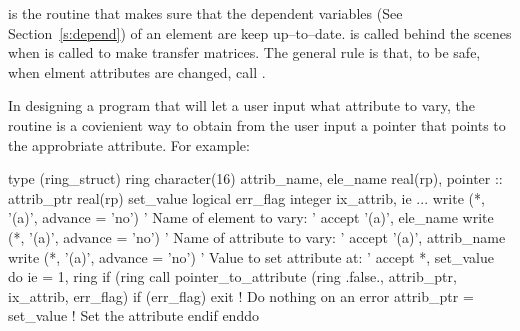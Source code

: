 {{{{{{{{{{{{ is the routine that makes sure that the
dependent variables (See Section~\ref{s:depend}) of an element are
keep up--to--date.  is called behind the
scenes when  is called to make transfer matrices. The
general rule is that, to be safe, when elment attributes are changed,
call .

In designing a program that will let a user input what
attribute to vary, the routine  
is a covienient way to obtain from the user input a pointer
that points to the approbriate attribute.
For example:
\begin{example}
  type (ring_struct) ring
  character(16) attrib_name, ele_name
  real(rp), pointer :: attrib_ptr
  real(rp) set_value
  logical err_flag
  integer ix_attrib, ie
  ...
  write (*, '(a)', advance = 'no') ' Name of element to vary: '
  accept '(a)', ele_name
  write (*, '(a)', advance = 'no') ' Name of attribute to vary: '
  accept '(a)', attrib_name
  write (*, '(a)', advance = 'no') ' Value to set attribute at: '
  accept *, set_value
  do ie = 1, ring%
    if (ring%
      call pointer_to_attribute (ring%
                            .false., attrib_ptr, ix_attrib, err_flag)
      if (err_flag) exit      ! Do nothing on an error
      attrib_ptr = set_value  ! Set the attribute
    endif
  enddo
\end{example}

\vn{%
whether it is the strength or field that is the 
independent variable. See Section~\ref{s:depend} for more details.

\section{Transfer Maps}

The first order transfer map through a element is stored in \vn{vec0}
and \vn{mat6}. Thus with \vn{Linear} tracking the appropriate formula is
\begin{example}
  orbit_out = %
\end{example}
The \bmad\ routines that compute \vn{%
take a reference orbit as an argument and the resulting \vn{%
is the Jacobian about the reference orbit.

}}}}}}}}}}}}}}}
